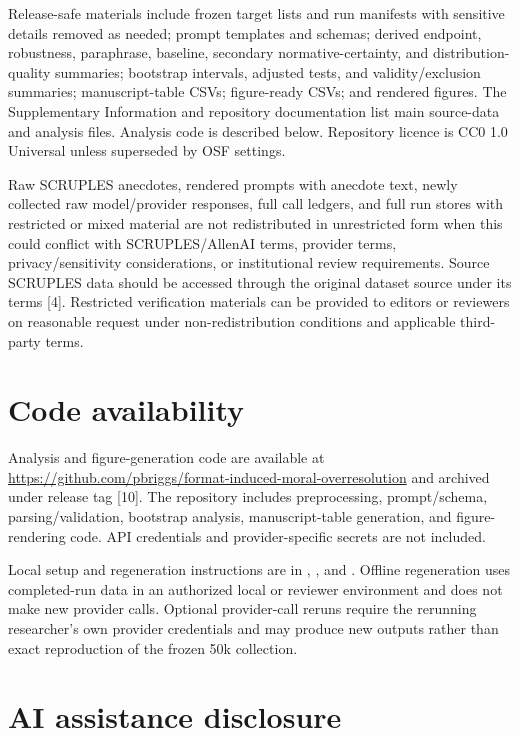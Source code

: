 \documentclass[11pt]{article}
\begin{document}
Release-safe materials include frozen target lists and run manifests with sensitive details removed as needed; prompt templates and schemas; derived endpoint, robustness, paraphrase, baseline, secondary normative-certainty, and distribution-quality summaries; bootstrap intervals, adjusted tests, and validity/exclusion summaries; manuscript-table CSVs; figure-ready CSVs; and rendered figures. The Supplementary Information and repository documentation list main source-data and analysis files. Analysis code is described below. Repository licence is CC0 1.0 Universal unless superseded by OSF settings.

Raw SCRUPLES anecdotes, rendered prompts with anecdote text, newly collected raw model/provider responses, full call ledgers, and full run stores with restricted or mixed material are not redistributed in unrestricted form when this could conflict with SCRUPLES/AllenAI terms, provider terms, privacy/sensitivity considerations, or institutional review requirements. Source SCRUPLES data should be accessed through the original dataset source under its terms [4]. Restricted verification materials can be provided to editors or reviewers on reasonable request under non-redistribution conditions and applicable third-party terms.

\section{Code availability}

Analysis and figure-generation code are available at \url{https://github.com/pbriggs/format-induced-moral-overresolution} and archived under release tag  [10]. The repository includes preprocessing, prompt/schema, parsing/validation, bootstrap analysis, manuscript-table generation, and figure-rendering code. API credentials and provider-specific secrets are not included.

Local setup and regeneration instructions are in , , and . Offline regeneration uses completed-run data in an authorized local or reviewer environment and does not make new provider calls. Optional provider-call reruns require the rerunning researcher's own provider credentials and may produce new outputs rather than exact reproduction of the frozen 50k collection.

\section{AI assistance disclosure}
\end{document}
